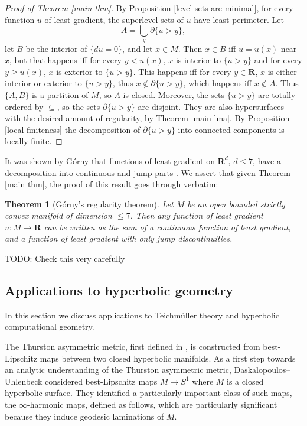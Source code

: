 \documentclass[reqno,12pt,letterpaper]{amsart}
\newcommand{\RR}{\mathbf{R}}
\newtheorem{theorem}{Theorem}[section]
\theoremstyle{definition}
\numberwithin{equation}{section}
\begin{document}
\begin{proof}[Proof of Theorem \ref{main thm}]
By Proposition \ref{level sets are minimal}, for every function $u$ of least gradient, the superlevel sets of $u$ have least perimeter.
Let
\begin{equation}\label{lamination union}
A = \bigcup_y \partial \{u > y\},
\end{equation}
let $B$ be the interior of $\{du = 0\}$, and let $x \in M$.
Then $x \in B$ iff $u = u(x)$ near $x$, but that happens iff for every $y < u(x)$, $x$ is interior to $\{u > y\}$ and for every $y \geq u(x)$, $x$ is exterior to $\{u > y\}$.
This happens iff for every $y \in \RR$, $x$ is either interior or exterior to $\{u > y\}$, thus $x \notin \partial \{u > y\}$, which happens iff $x \notin A$.
Thus $\{A, B\}$ is a partition of $M$, so $A$ is closed.
Moreover, the sets $\{u > y\}$ are totally ordered by $\subseteq$, so the sets $\partial \{u > y\}$ are disjoint.
They are also hypersurfaces with the desired amount of regularity, by Theorem \ref{main lma}.
By Proposition \ref{local finiteness} the decomposition of $\partial \{u > y\}$ into connected components is locally finite.
\end{proof}

It was shown by G\'orny that functions of least gradient on $\RR^d$, $d \leq 7$, have a decomposition into continuous and jump parts \cite[Theorem 1.2]{górny2017planar}.
We assert that given Theorem \ref{main thm}, the proof of this result goes through verbatim:

\begin{theorem}[G\'orny's regularity theorem]\label{Gorny regularity}
Let $M$ be an open bounded strictly convex manifold of dimension $\leq 7$.
Then any function of least gradient $u: M \to \RR$ can be written as the sum of a continuous function of least gradient, and a function of least gradient with only jump discontinuities.
\end{theorem}

TODO: Check this very carefully


\subsection{Applications to hyperbolic geometry}
In this section we discuss applications to Teichm\"uller theory and hyperbolic computational geometry.

The Thurston asymmetric metric, first defined in \cite{thurston1998minimal}, is constructed from best-Lipschitz maps between two closed hyperbolic manifolds.
As a first step towards an analytic understanding of the Thurston asymmetric metric, Daskalopoulos--Uhlenbeck \cite{daskalopoulos2020transverse} considered best-Lipschitz maps $M \to S^1$ where $M$ is a closed hyperbolic surface.
They identified a particularly important class of such maps, the $\infty$-harmonic maps, defined as follows, which are particularly significant because they induce geodesic laminations of $M$.
\end{document}
